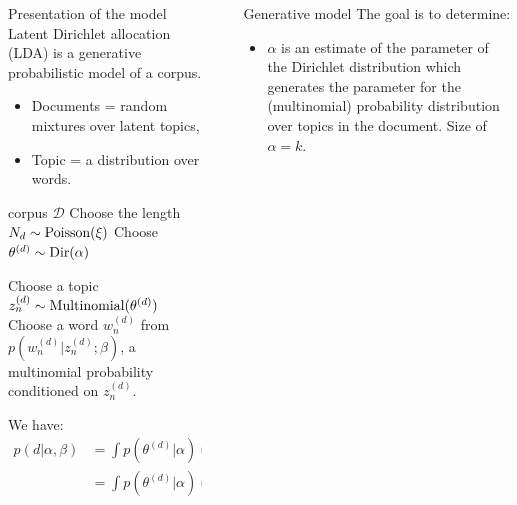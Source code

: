\documentclass[final]{beamer}
\newlength{\sepwid}
\newlength{\onecolwid}
\begin{document}
\begin{frame}[t]
\begin{columns}[t]
\begin{column}{\onecolwid}
\begin{block}{Presentation of the model}
Latent Dirichlet allocation (LDA) is a generative probabilistic model of a corpus. 
\begin{itemize}
  \item Documents = random mixtures over latent topics,
  \item Topic = a distribution over words. 
\end{itemize} 

\medskip

\begin{algorithmic}[1]
\ENSURE corpus $\mathcal{D}$
\STATE Choose the length $N_d \sim \textnormal{Poisson}(\xi)$
\STATE Choose $\theta^{(d)} \sim \textnormal{Dir}(\alpha)$

\STATE Choose a topic $z_n^{(d)} \sim \textnormal{Multinomial}(\theta^{(d)})$
\STATE Choose a word $w_n^{(d)}$ from $p(w_n^{(d)} | z_n^{(d)}; \beta)$, a multinomial probability conditioned on $z_n^{(d)}$.
\ENDFOR
\ENDFOR
\end{algorithmic}

We have:
\begin{align*}
p(d|\alpha, \beta) 
& = \int p(\theta^{(d)}|\alpha) \left( \prod_{n=1}^{N_{d}} p(w_n^{(d)}|\theta^{(d)}, \beta)\right) \text{d}\theta  \\
& = \int p(\theta^{(d)}|\alpha) \left( \prod_{n=1}^{N_{d}} \sum_{z_n^{(d)}} p(z_n^{(d)}|\theta^{(d)}) p(w_n^{(d)}|z_n^{(d)}, \beta)\right) \text{d}\theta
\end{align*}

\end{block}

\end{column}



\begin{column}{\sepwid}\end{column} %
\begin{column}{\onecolwid}
\begin{block}{Generative model}
The goal is to determine:
\begin{itemize}
\item $\alpha$ is an estimate of the parameter of the Dirichlet distribution which generates the parameter for the (multinomial) probability distribution over topics in the document. Size of $\alpha = k$.


\end{itemize}
\end{block}
\end{column}
\end{columns}
\end{frame}
\end{document}
